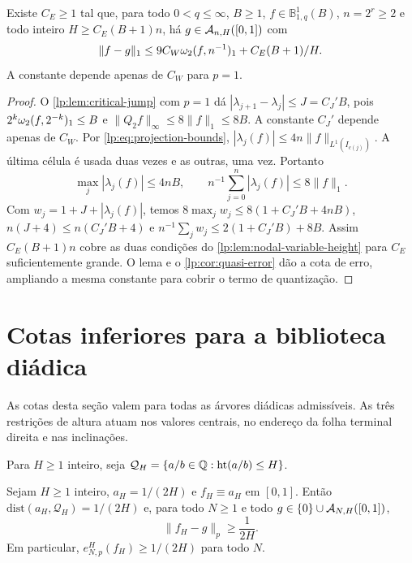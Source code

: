 \documentclass[12pt,a4paper]{article}
\begin{document}
\begin{proposicao}
\label{lp:prop:l1-linear-height}
Existe $C_E\ge1$ tal que, para todo $0<q\le\infty$, $B\ge1$, $f\in\mathbb B^1_{1,q}(B)$, $n=2^r\ge2$ e todo inteiro $H\ge C_E(B+1)n$, há $g\in\mathcal A_{n,H}([0,1])$ com
\[
 \|f-g\|_1\le9C_W\omega_2(f,n^{-1})_{1}+C_E(B+1)/H.
\]
A constante depende apenas de $C_W$ para $p=1$.
\end{proposicao}

\begin{proof}
O \cref{lp:lem:critical-jump} com $p=1$ dá $|\lambda_{j+1}-\lambda_j|\le J=C_J'B$, pois $2^k\omega_2(f,2^{-k})_{1}\le B$ e $\|Q_2f\|_\infty\le8\|f\|_1\le8B$. A constante $C_J'$ depende apenas de $C_W$. Por \eqref{lp:eq:projection-bounds}, $|\lambda_j(f)|\le4n\|f\|_{L^1(I_{c(j)})}$. A última célula é usada duas vezes e as outras, uma vez. Portanto
\[
 \max_j|\lambda_j(f)|\le4nB,\qquad n^{-1}\sum_{j=0}^n|\lambda_j(f)|\le8\|f\|_1.
\]
Com $w_j=1+J+|\lambda_j(f)|$, temos $8\max_jw_j\le8(1+C_J'B+4nB)$, $n(J+4)\le n(C_J'B+4)$ e $n^{-1}\sum_jw_j\le2(1+C_J'B)+8B$. Assim $C_E(B+1)n$ cobre as duas condições do \cref{lp:lem:nodal-variable-height} para $C_E$ suficientemente grande. O lema e o \cref{lp:cor:quasi-error} dão a cota de erro, ampliando a mesma constante para cobrir o termo de quantização.
\end{proof}

\section{Cotas inferiores para a biblioteca diádica}
\label{lp:sec:floors}

As cotas desta seção valem para todas as árvores diádicas admissíveis. As três restrições de altura atuam nos valores centrais, no endereço da folha terminal direita e nas inclinações.

Para $H\ge1$ inteiro, seja $\mathcal Q_H=\{a/b\in\mathbb Q:\operatorname{ht}(a/b)\le H\}$.

\begin{proposicao}
\label{lp:prop:floor}
Sejam $H\ge1$ inteiro, $a_H=1/(2H)$ e $f_H\equiv a_H$ em $[0,1]$. Então $\mathrm{dist}(a_H,\mathcal Q_H)=1/(2H)$ e, para todo $N\ge1$ e todo $g\in\{0\}\cup\mathcal A_{N,H}([0,1])$,
\begin{equation}
 \|f_H-g\|_p\ge\frac1{2H}.
 \label{lp:eq:floor}
\end{equation}
Em particular, $e^{H}_{N,p}(f_H)\ge1/(2H)$ para todo $N$.
\end{proposicao}
\end{document}
